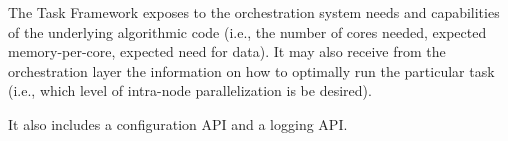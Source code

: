 \documentclass[DM,lsstdraft,toc]{lsstdoc}
\begin{document}
The Task Framework exposes to the orchestration system needs and
capabilities of the underlying algorithmic code (i.e., the number of
cores needed, expected memory-per-core, expected need for data). It may
also receive from the orchestration layer the information on how to
optimally run the particular task (i.e., which level of intra-node
parallelization is be desired).

It also includes a configuration API and a logging API.





\end{document}
